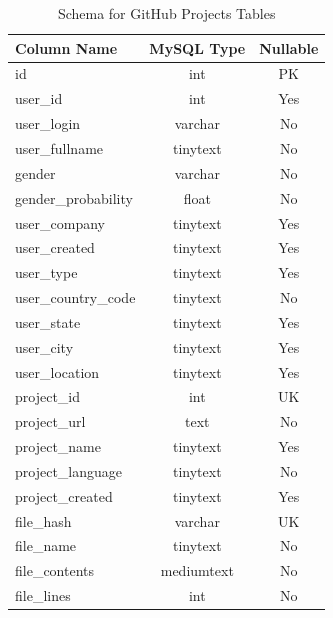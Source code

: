 \documentclass[12pt]{article}
\begin{document}
\begin{table}[h!]
    \begin{center}
        \caption{Schema for GitHub Projects Tables}
        \label{tab:git_projects_schema}
        \begin{tabular}{|l | c | c |}
            \hline
            \textbf{Column Name} & \textbf{MySQL Type} & \textbf{Nullable}\\
            \hline
            id & int & PK\\
            user{\_}id & int & Yes\\
            user{\_}login & varchar & No\\
            user{\_}fullname & tinytext & No\\
            gender & varchar & No\\
            gender{\_}probability & float & No\\
            user{\_}company  & tinytext & Yes\\
            user{\_}created & tinytext & Yes\\
            user{\_}type & tinytext & Yes\\
            user{\_}country{\_}code & tinytext & No\\
            user{\_}state & tinytext & Yes\\
            user{\_}city & tinytext & Yes\\
            user{\_}location & tinytext & Yes\\
            \hline
            project{\_}id & int & UK\\
            project{\_}url & text & No\\
            project{\_}name & tinytext & Yes\\
            project{\_}language & tinytext & No\\
            project{\_}created & tinytext & Yes\\
            \hline
            file{\_}hash & varchar & UK\\
            file{\_}name & tinytext & No\\
            file{\_}contents & mediumtext & No\\
            file{\_}lines & int & No\\
            \hline
        \end{tabular}
    \end{center}
\end{table}
\end{document}
